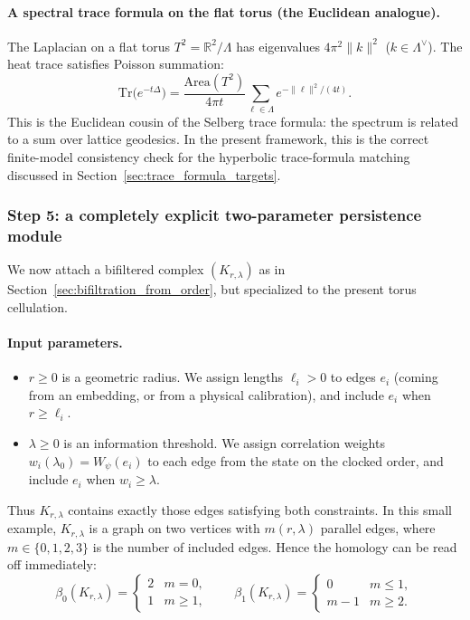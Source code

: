 \documentclass[11pt,oneside]{amsbook}
\numberwithin{equation}{section}
\theoremstyle{plain}
\theoremstyle{definition}
\theoremstyle{remark}
\newcommand{\R}{\mathbb{R}}
\begin{document}
\paragraph{A spectral trace formula on the flat torus (the Euclidean analogue).}
The Laplacian on a flat torus $T^2=\R^2/\Lambda$ has eigenvalues $4\pi^2\|k\|^2$ ($k\in\Lambda^\vee$).
The heat trace satisfies Poisson summation:
\[
\mathrm{Tr}\big(e^{-t\Delta}\big)=\frac{\mathrm{Area}(T^2)}{4\pi t}\sum_{\ell\in\Lambda}e^{-\|\ell\|^2/(4t)}.
\]
This is the Euclidean cousin of the Selberg trace formula: the spectrum is related to a sum over lattice geodesics.
In the present framework, this is the correct finite-model consistency check for the hyperbolic trace-formula matching discussed in Section~\ref{sec:trace_formula_targets}.

\subsubsection{Step 5: a completely explicit two-parameter persistence module}

We now attach a bifiltered complex $(K_{r,\lambda})$ as in Section~\ref{sec:bifiltration_from_order}, but specialized to the present torus cellulation.

\paragraph{Input parameters.}
\begin{itemize}
\item $r\ge 0$ is a geometric radius.
We assign lengths $\ell_i>0$ to edges $e_i$ (coming from an embedding, or from a physical calibration), and include $e_i$ when $r\ge \ell_i$.
\item $\lambda\ge 0$ is an information threshold.
We assign correlation weights $w_i(\lambda_0)=W_\psi(e_i)$ to each edge from the state on the clocked order, and include $e_i$ when $w_i\ge \lambda$.
\end{itemize}

Thus $K_{r,\lambda}$ contains exactly those edges satisfying both constraints.
In this small example, $K_{r,\lambda}$ is a graph on two vertices with $m(r,\lambda)$ parallel edges, where $m\in\{0,1,2,3\}$ is the number of included edges.
Hence the homology can be read off immediately:
\[
\beta_0(K_{r,\lambda})=
\begin{cases}
2 & m=0,\\
1 & m\ge 1,
\end{cases}
\qquad
\beta_1(K_{r,\lambda})=
\begin{cases}
0 & m\le 1,\\
m-1 & m\ge 2.
\end{cases}
\]
\end{document}
